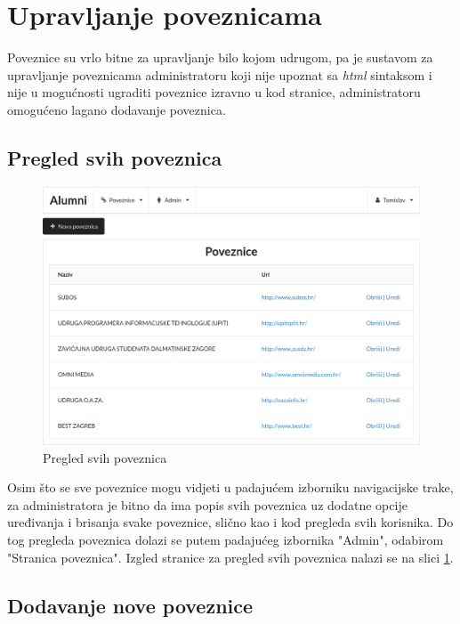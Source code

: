 \documentclass[zavrsni, numeric]{fer}
\begin{document}
\section{Upravljanje poveznicama}
Poveznice su vrlo bitne za upravljanje bilo kojom udrugom, pa je sustavom za upravljanje poveznicama administratoru koji nije upoznat sa \textit{html} sintaksom i nije u mogućnosti ugraditi poveznice izravno u kod stranice, administratoru omogućeno lagano dodavanje poveznica.

\subsection{Pregled svih poveznica}

\begin{figure}[H]
	\centering
	\includegraphics[width=13cm]{slike/poveznice.png}
	\caption{Pregled svih poveznica}
	\label{fig:poveznice}
\end{figure}

Osim što se sve poveznice mogu vidjeti u padajućem izborniku navigacijske trake, za administratora je bitno da ima popis svih poveznica uz dodatne opcije uređivanja i brisanja svake poveznice, slično kao i kod pregleda svih korisnika. Do tog pregleda poveznica dolazi se putem padajućeg izbornika "Admin", odabirom "Stranica poveznica". Izgled stranice za pregled svih poveznica nalazi se na slici \ref{fig:poveznice}.

\subsection{Dodavanje nove poveznice}
\end{document}

